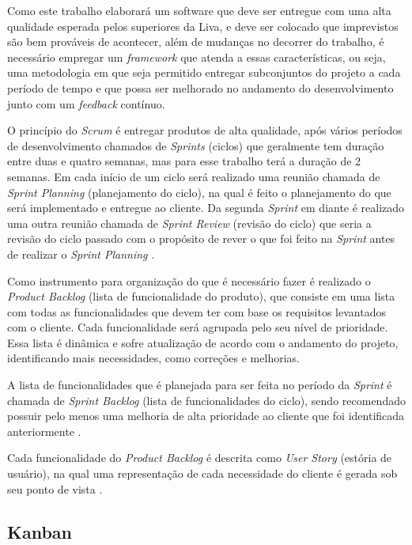 Como este trabalho elaborará um software que deve ser entregue com uma alta qualidade esperada pelos superiores da Liva, e deve ser colocado que imprevistos são bem prováveis de acontecer, além de mudanças no decorrer do trabalho, é necessário empregar um \textit{framework} que atenda a essas características, ou seja, uma metodologia em que seja permitido entregar subconjuntos do projeto a cada período de tempo e que possa ser melhorado no andamento do desenvolvimento junto com um \textit{feedback} contínuo.

O princípio do \textit{Scrum} é entregar produtos de alta qualidade, após vários períodos de desenvolvimento chamados de \textit{Sprints} (ciclos) que geralmente tem duração entre duas e quatro semanas, mas para esse trabalho terá a duração de 2 semanas. Em cada início de um ciclo será realizado uma reunião chamada de \textit{Sprint Planning} (planejamento do ciclo), na qual é feito o planejamento do que será implementado e entregue ao cliente. Da segunda \textit{Sprint} em diante é realizado uma outra reunião chamada de \textit{Sprint Review} (revisão do ciclo) que seria a revisão do ciclo passado com o propósito de rever o que foi feito na \textit{Sprint} antes de realizar o \textit{Sprint Planning} \cite{ijcf94}.

Como instrumento para organização do que é necessário fazer é realizado o \textit{Product Backlog} (lista de funcionalidade do produto), que consiste em uma lista com todas as funcionalidades que devem ter com base os requisitos levantados com o cliente. Cada funcionalidade será agrupada pelo seu nível de prioridade. Essa lista é dinâmica e sofre atualização de acordo com o andamento do projeto, identificando mais necessidades, como correções e melhorias.

A lista de funcionalidades que é planejada para ser feita no período da \textit{Sprint} é chamada de \textit{Sprint Backlog} (lista de funcionalidades do ciclo), sendo recomendado possuir pelo menos uma melhoria de alta prioridade ao cliente que foi identificada anteriormente \cite{ijcf94}.

Cada funcionalidade do \textit{Product Backlog} é descrita como \textit{User Story} (estória de usuário), na qual uma representação de cada necessidade do cliente é gerada sob seu ponto de vista \cite{knowledge21:2019}.

\subsection{Kanban}
\label{section_kanban}

